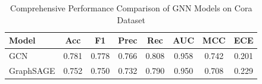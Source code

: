 \begin{table}[h]
\centering
\caption{Comprehensive Performance Comparison of GNN Models on Cora Dataset}
\label{tab:gnn_comparison}
\begin{tabular}{l|ccccccc}
\hline
\textbf{Model} & \textbf{Acc} & \textbf{F1} & \textbf{Prec} & \textbf{Rec} & \textbf{AUC} & \textbf{MCC} & \textbf{ECE} \\
\hline
GCN & 0.781 & 0.778 & 0.766 & 0.808 & 0.958 & 0.742 & 0.201 \\
GraphSAGE & 0.752 & 0.750 & 0.732 & 0.790 & 0.950 & 0.708 & 0.229 \\
\hline
\end{tabular}
\end{table}
